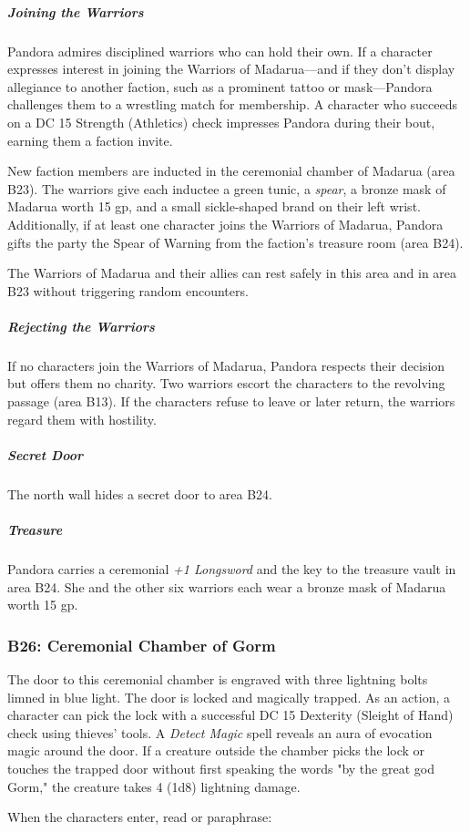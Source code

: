 \documentclass[10pt,a4paper,twoside,bg=print,twocolumn,openany,nodeprecatedcode]{dndbook}
\begin{document}
\subparagraph{Joining the Warriors}
Pandora admires disciplined warriors who can hold their own. If a character expresses interest in joining the Warriors of Madarua—and if they don't display allegiance to another faction, such as a prominent tattoo or mask—Pandora challenges them to a wrestling match for membership. A character who succeeds on a DC 15 Strength (Athletics) check impresses Pandora during their bout, earning them a faction invite.

New faction members are inducted in the ceremonial chamber of Madarua (area B23). The warriors give each inductee a green tunic, a \textit{spear}, a bronze mask of Madarua worth 15 gp, and a small sickle-shaped brand on their left wrist. Additionally, if at least one character joins the Warriors of Madarua, Pandora gifts the party the Spear of Warning from the faction's treasure room (area B24).

The Warriors of Madarua and their allies can rest safely in this area and in area B23 without triggering random encounters.

\subparagraph{Rejecting the Warriors}
If no characters join the Warriors of Madarua, Pandora respects their decision but offers them no charity. Two warriors escort the characters to the revolving passage (area B13). If the characters refuse to leave or later return, the warriors regard them with hostility.

\subparagraph{Secret Door}
The north wall hides a secret door to area B24.

\subparagraph{Treasure}
Pandora carries a ceremonial \textit{+1 Longsword} and the key to the treasure vault in area B24. She and the other six warriors each wear a bronze mask of Madarua worth 15 gp.

\subsubsection{B26: Ceremonial Chamber of Gorm}
The door to this ceremonial chamber is engraved with three lightning bolts limned in blue light. The door is locked and magically trapped. As an action, a character can pick the lock with a successful DC 15 Dexterity (Sleight of Hand) check using thieves' tools. A \textit{Detect Magic} spell reveals an aura of evocation magic around the door. If a creature outside the chamber picks the lock or touches the trapped door without first speaking the words "by the great god Gorm," the creature takes 4 (1d8) lightning damage.

When the characters enter, read or paraphrase:
\end{document}
